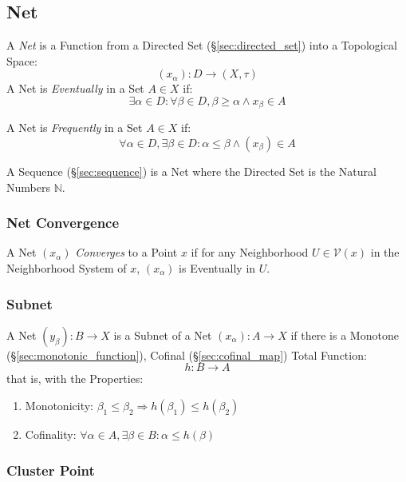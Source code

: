 \subsection{Net}\label{sec:net}

A \emph{Net} is a Function from a Directed Set
(\S\ref{sec:directed_set}) into a Topological Space:
\[
  (x_\alpha) : D \rightarrow (X, \tau)
\]
A Net is \emph{Eventually} in a Set $A \in X$ if:
\[
  \exists \alpha \in D
  : \forall \beta \in D, \beta \geq \alpha \wedge x_\beta \in A
\]

A Net is \emph{Frequently} in a Set $A \in X$ if:
\[
  \forall \alpha \in D, \exists \beta \in D
  : \alpha \leq \beta \wedge (x_\beta) \in A
\]

A Sequence (\S\ref{sec:sequence}) is a Net where the Directed Set is
the Natural Numbers $\mathbb{N}$.



\subsubsection{Net Convergence}\label{sec:net_convergence}

A Net $(x_\alpha)$ \emph{Converges} to a Point $x$ if for any
Neighborhood $U \in \mathcal{V}(x)$ in the Neighborhood System of $x$,
$(x_\alpha)$ is Eventually in $U$.



\subsubsection{Subnet}\label{sec:subnet}

A Net $(y_\beta) : B \rightarrow X$ is a Subnet of a Net $(x_\alpha) :
A \rightarrow X$ if there is a Monotone
(\S\ref{sec:monotonic_function}), Cofinal (\S\ref{sec:cofinal_map})
Total Function:
\[
  h : B \rightarrow A
\]
that is, with the Properties:
\begin{enumerate}
  \item Monotonicity:
  $\beta_1 \leq \beta_2 \Rightarrow h(\beta_1) \leq h(\beta_2)$
  \item Cofinality:
   $\forall \alpha \in A, \exists \beta \in B : \alpha \leq h(\beta)$
\end{enumerate}



\subsubsection{Cluster Point}\label{sec:cluster_point}

